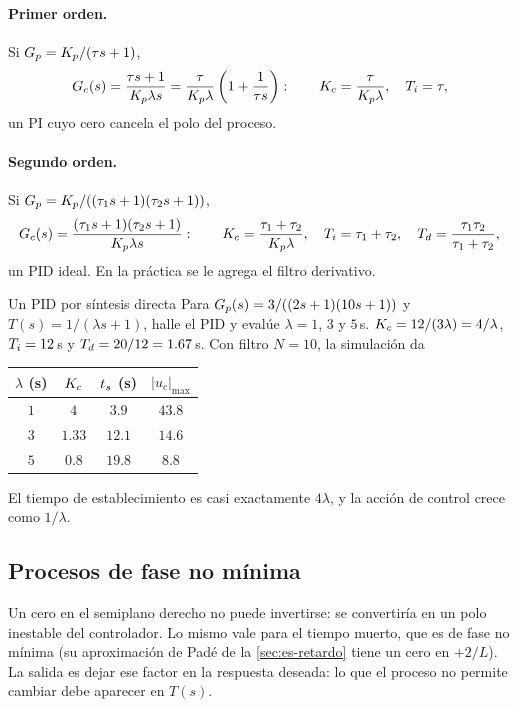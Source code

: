 \paragraph{Primer orden.} Si $G_p=K_p/(\tau s+1)$,
\[
  G_c(s)=\frac{\tau s+1}{K_p\lambda s}=\frac{\tau}{K_p\lambda}\left(1+\frac{1}{\tau s}\right):
  \qquad K_c=\frac{\tau}{K_p\lambda},\quad T_i=\tau ,
\]
un PI cuyo cero cancela el polo del proceso.

\paragraph{Segundo orden.} Si $G_p=K_p/((\tau_1s+1)(\tau_2s+1))$,
\[
  G_c(s)=\frac{(\tau_1s+1)(\tau_2s+1)}{K_p\lambda s}:
  \qquad K_c=\frac{\tau_1+\tau_2}{K_p\lambda},\quad T_i=\tau_1+\tau_2,\quad T_d=\frac{\tau_1\tau_2}{\tau_1+\tau_2},
\]
un PID ideal. En la práctica se le agrega el filtro derivativo.

\begin{ejemplo}[label=ej:ps-sintesis]{Un PID por síntesis directa}
Para $G_p(s)=3/((2s+1)(10s+1))$ y $T(s)=1/(\lambda s+1)$, halle el PID y evalúe $\lambda=1$, $3$ y $5$\,s.
\solucion $K_c=12/(3\lambda)=4/\lambda$, $T_i=12$\,s y $T_d=20/12=1.67$\,s. Con filtro $N=10$, la simulación da
\begin{center}
\renewcommand{\arraystretch}{1.2}
\begin{tabular}{@{}cccc@{}}
\toprule
$\lambda$ (s) & $K_c$ & $t_s$ (s) & $|u_c|_{\max}$\\
\midrule
$1$ & $4$ & $3.9$ & $43.8$\\
$3$ & $1.33$ & $12.1$ & $14.6$\\
$5$ & $0.8$ & $19.8$ & $8.8$\\
\bottomrule
\end{tabular}
\end{center}
El tiempo de establecimiento es casi exactamente $4\lambda$, y la acción de control crece como $1/\lambda$.
\end{ejemplo}


\subsection{Procesos de fase no mínima}

Un cero en el semiplano derecho no puede invertirse: se convertiría en un polo inestable del controlador. Lo mismo vale para el tiempo muerto, que es de fase no mínima (su aproximación de Padé de la \cref{sec:es-retardo} tiene un cero en $+2/L$). La salida es dejar ese factor en la respuesta deseada: lo que el proceso no permite cambiar debe aparecer en $T(s)$.

